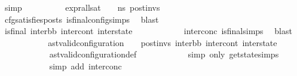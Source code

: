 \begin{isabellebody}
\ simp\isanewline
\ \ \ \ \ \ \ \ \isamarkupfalse%
\ {\isachardoublequoteopen}{\isacharparenleft}{\kern0pt}expr{\isacharunderscore}{\kern0pt}all{\isacharunderscore}{\kern0pt}sat\ {\isasymLambda}\ {\isasymGamma}\ {\isasymOmega}\ ns{}{\isacharparenright}{\kern0pt}\ post{\isacharunderscore}{\kern0pt}invs{\isachardoublequoteclose}\ \isanewline
\ \ \ \ \ \ \ \ \ \ \isamarkupfalse%
\ cfg{\isacharunderscore}{\kern0pt}satisfies{\isacharunderscore}{\kern0pt}posts\ is{\isacharunderscore}{\kern0pt}final{\isacharunderscore}{\kern0pt}config{\isachardot}{\kern0pt}simps{\isacharparenleft}{\kern0pt}{}{\isacharparenright}{\kern0pt}\ \isamarkupfalse%
\ blast\isanewline
\ \ \ \ \ \ \ \ \isamarkupfalse%
\ \isamarkupfalse%
\ {\isachardoublequoteopen}is{\isacharunderscore}{\kern0pt}final\ {\isacharparenleft}{\kern0pt}inter{\isacharunderscore}{\kern0pt}bb{\isacharcomma}{\kern0pt}\ inter{\isacharunderscore}{\kern0pt}cont{\isacharcomma}{\kern0pt}\ inter{\isacharunderscore}{\kern0pt}state{\isacharparenright}{\kern0pt}{\isachardoublequoteclose}\isanewline
\ \ \ \ \ \ \ \ \ \ \isamarkupfalse%
\ inter{\isacharunderscore}{\kern0pt}conc\ is{\isacharunderscore}{\kern0pt}final{\isachardot}{\kern0pt}simps{\isacharparenleft}{\kern0pt}{}{\isacharparenright}{\kern0pt}\ \isamarkupfalse%
\ blast\isanewline
\ \ \ \ \ \ \ \ \isamarkupfalse%
\ \isamarkupfalse%
\ {\isachardoublequoteopen}{\isacharparenleft}{\kern0pt}ast{\isacharunderscore}{\kern0pt}valid{\isacharunderscore}{\kern0pt}configuration\ {\isasymLambda}\ {\isasymGamma}\ {\isasymOmega}\ post{\isacharunderscore}{\kern0pt}invs\ inter{\isacharunderscore}{\kern0pt}bb\ inter{\isacharunderscore}{\kern0pt}cont\ inter{\isacharunderscore}{\kern0pt}state{\isacharparenright}{\kern0pt}{\isachardoublequoteclose}\ \isanewline
\ \ \ \ \ \ \ \ \ \ \isamarkupfalse%
\ ast{\isacharunderscore}{\kern0pt}valid{\isacharunderscore}{\kern0pt}configuration{\isacharunderscore}{\kern0pt}def\isanewline
\ \ \ \ \ \ \ \ \ \ \isamarkupfalse%
\ {\isacharparenleft}{\kern0pt}simp\ only{\isacharcolon}{\kern0pt}\ get{\isacharunderscore}{\kern0pt}state{\isachardot}{\kern0pt}simps{\isacharparenright}{\kern0pt}\isanewline
\ \ \ \ \ \ \ \ \ \ \isamarkupfalse%
\ {\isacharparenleft}{\kern0pt}simp\ add{\isacharcolon}{\kern0pt}\ inter{\isacharunderscore}{\kern0pt}conc{\isacharparenright}{\kern0pt}\isanewline

\end{isabellebody}
